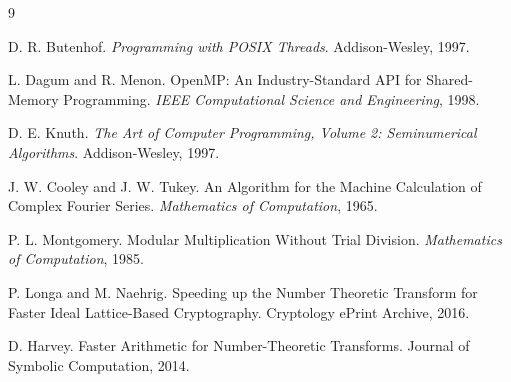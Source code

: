 \documentclass[UTF8,a4paper,10pt]{ctexart}
\begin{document}
\newpage
\begin{thebibliography}{9}

D. R. Butenhof.
\newblock \emph{Programming with POSIX Threads}.
\newblock Addison-Wesley, 1997.

L. Dagum and R. Menon.
\newblock OpenMP: An Industry-Standard API for Shared-Memory Programming.
\newblock \emph{IEEE Computational Science and Engineering}, 1998.

D. E. Knuth.
\newblock \emph{The Art of Computer Programming, Volume 2: Seminumerical Algorithms}.
\newblock Addison-Wesley, 1997.

J. W. Cooley and J. W. Tukey.
\newblock An Algorithm for the Machine Calculation of Complex Fourier Series.
\newblock \emph{Mathematics of Computation}, 1965.

P. L. Montgomery.
\newblock Modular Multiplication Without Trial Division.
\newblock \emph{Mathematics of Computation}, 1985.

P. Longa and M. Naehrig.
\newblock Speeding up the Number Theoretic Transform for Faster Ideal Lattice-Based Cryptography.
\newblock Cryptology ePrint Archive, 2016.

D. Harvey.
\newblock Faster Arithmetic for Number-Theoretic Transforms.
\newblock Journal of Symbolic Computation, 2014.

\end{thebibliography}
\end{document}
